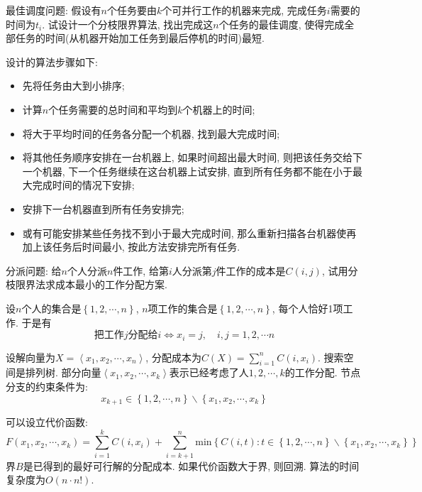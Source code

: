 \documentclass{article}
\begin{document}
\pagebreak





\begin{homeworkProblem}
	最佳调度问题: 假设有$n $个任务要由$k $个可并行工作的机器来完成, 完成任务$i $需要的时间为$t_i$. 试设计一个分枝限界算法, 找出完成这$n $个任务的最佳调度, 使得完成全部任务的时间(从机器开始加工任务到最后停机的时间)最短.

	\solution 设计的算法步骤如下:
	\begin{itemize}
		\item 先将任务由大到小排序;
		\item 计算$n$个任务需要的总时间和平均到$k$个机器上的时间;
		\item 将大于平均时间的任务各分配一个机器, 找到最大完成时间;
		\item 将其他任务顺序安排在一台机器上, 如果时间超出最大时间, 则把该任务交给下一个机器, 下一个任务继续在这台机器上试安排, 直到所有任务都不能在小于最大完成时间的情况下安排;
		\item 安排下一台机器直到所有任务安排完;
		\item 或有可能安排某些任务找不到小于最大完成时间, 那么重新扫描各台机器使再加上该任务后时间最小, 按此方法安排完所有任务.
	\end{itemize}
\end{homeworkProblem}

\begin{homeworkProblem}
	分派问题: 给$n$个人分派$n$件工作, 给第$i$人分派第$j$件工作的成本是$C(i,j)$, 试用分枝限界法求成本最小的工作分配方案.

	\solution 设$n$个人的集合是$\left\{ 1,2,\cdots,n \right\}$, $n$项工作的集合是$\left\{ 1,2,\cdots,n \right\}$, 每个人恰好1项工作. 于是有
	$$\text{把工作}j\text{分配给}i\Leftrightarrow x_i=j,\quad i,j=1,2,\cdots n
	$$

	设解向量为$X=\left< x_1,x_2,\cdots ,x_n \right>	$, 分配成本为$\displaystyle C\left( X \right) =\sum_{i=1}^n{C\left( i,x_i \right)}	$. 搜索空间是排列树. 部分向量$\left< x_1,x_2,\cdots ,x_k \right> $表示已经考虑了人$1,2,\cdots,k$的工作分配. 节点分支的约束条件为:$$x_{k+1}\in \left\{ 1,2,\cdots ,n \right\} \backslash \left\{ x_1,x_2,\cdots ,x_k \right\} 
	$$

	可以设立代价函数:$$F\left( x_1,x_2,\cdots ,x_k \right) =\sum_{i=1}^k{C\left( i,x_i \right)}+\sum_{i=k+1}^n{\text{min} \left\{ C\left( i,t \right) :t\in \left\{ 1,2,\cdots ,n \right\} \backslash \left\{ x_1,x_2,\cdots ,x_k \right\} \right\}}
	$$
	界$B$是已得到的最好可行解的分配成本. 如果代价函数大于界, 则回溯. 算法的时间复杂度为$O(n\cdot n!)$.
\end{homeworkProblem}
\end{document}
